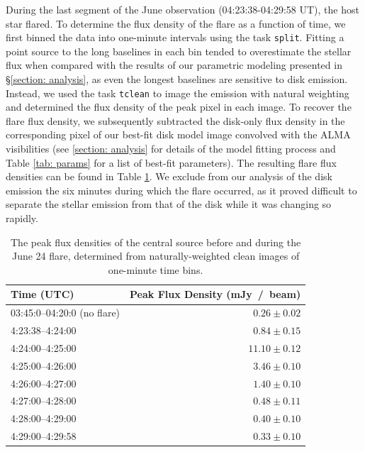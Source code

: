 \documentclass[modern]{aastex62}
\begin{document}
During the last segment of the June observation (04:23:38-04:29:58 UT), the host star flared. 
To determine the flux density of the flare as a function of time, we first binned the data into one-minute intervals using the task \texttt{split}. 
Fitting a point source to the long baselines in each bin tended to overestimate the stellar flux when compared with the results of our parametric modeling presented in \S \ref{section: analysis}, as even the longest baselines are sensitive to disk emission.
Instead, we used the task \texttt{tclean} to image the emission with natural weighting and determined the flux density of the peak pixel in each image. 
To recover the flare flux density, we subsequently subtracted the disk-only flux density in the corresponding pixel of our best-fit disk model image convolved with the ALMA visibilities (see \ref{section: analysis} for details of the model fitting process and Table \ref{tab: params} for a list of best-fit parameters).
The resulting flare flux densities can be found in Table \ref{tab:flare fluxes}.
We exclude from our analysis of the disk emission the six minutes during which the flare occurred, as it proved difficult to separate the stellar emission from that of the disk while it was changing so rapidly.

\begin{table}	
  \centering
  \begin{tabular}{lr}
    \toprule
    Time (UTC) & Peak Flux Density (\si{mJy / beam}) \\
    \midrule
    03:45:0--04:20:0 (no flare) & $0.26 \pm 0.02$\\
  	4:23:38--4:24:00 & $0.84  \pm 0.15$ \\
  	4:24:00--4:25:00 & $11.10 \pm 0.12$ \\
  	4:25:00--4:26:00 & $3.46  \pm 0.10$ \\
  	4:26:00--4:27:00 & $1.40  \pm 0.10$ \\
  	4:27:00--4:28:00 & $0.48  \pm 0.11$ \\
  	4:28:00--4:29:00 & $0.40  \pm 0.10$ \\
  	4:29:00--4:29:58 & $0.33  \pm 0.10$\\
    \bottomrule
  \end{tabular}
	\caption{The peak flux densities of the central source before and during the June 24 flare, determined from naturally-weighted clean images of one-minute time bins.}
  \label{tab:flare fluxes}
\end{table}
\end{document}
